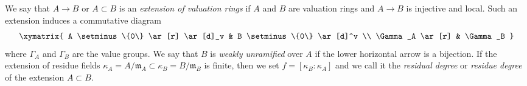 \begin{definition}
\label{definition-extension-valuation-rings}
We say that $A \to B$ or $A \subset B$ is an
{\it extension of valuation rings} if $A$ and $B$ are
valuation rings and $A \to B$ is injective and local.
Such an extension induces a commutative diagram
$$
\xymatrix{
A \setminus \{0\} \ar[r] \ar[d]_v & B \setminus \{0\} \ar[d]^v \\
\Gamma_A \ar[r] & \Gamma_B
}
$$
where $\Gamma_A$ and $\Gamma_B$ are the value groups.
We say that $B$ is {\it weakly unramified} over $A$ if
the lower horizontal arrow is a bijection.
If the extension of residue fields
$\kappa_A = A/\mathfrak m_A \subset \kappa_B = B/\mathfrak m_B$
is finite, then we set $f = [\kappa_B : \kappa_A]$ and we
call it the {\it residual degree} or {\it residue degree}
of the extension $A \subset B$.
\end{definition}